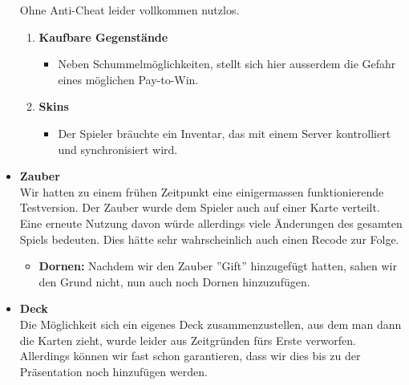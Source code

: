 \begin{itemize}
    Ohne Anti-Cheat leider vollkommen nutzlos.
    \begin{enumerate}
        \item \textbf{Kaufbare Gegenstände}
        \begin{itemize}
            \item Neben Schummelmöglichkeiten, stellt sich hier ausserdem die Gefahr eines möglichen Pay-to-Win.
        \end{itemize}
        \item \textbf{Skins}
        \begin{itemize}
            \item Der Spieler bräuchte ein Inventar, das mit einem Server kontrolliert und synchronisiert wird. 
        \end{itemize}
    \end{enumerate}
    \item \textbf{Zauber} \\
        Wir hatten zu einem frühen Zeitpunkt eine einigermassen funktionierende Testversion. Der Zauber wurde dem Spieler auch auf einer Karte verteilt. 
        Eine erneute Nutzung davon würde allerdings viele Änderungen des gesamten Spiels bedeuten. Dies hätte sehr wahrscheinlich auch einen Recode zur Folge.
    \begin{itemize}
        \item \textbf{Dornen:}
            Nachdem wir den Zauber ''Gift'' hinzugefügt hatten, sahen wir den Grund nicht, nun auch noch Dornen hinzuzufügen.
    \end{itemize}
    \item \textbf{Deck} \\
        Die Möglichkeit sich ein eigenes Deck zusammenzustellen, aus dem man dann die Karten zieht, wurde leider aus Zeitgründen fürs Erste verworfen. Allerdings können wir
        fast schon garantieren, dass wir dies bis zu der Präsentation noch hinzufügen werden.     
\end{itemize}